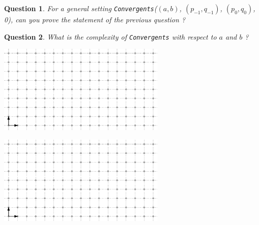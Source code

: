\documentclass[a4paper, 11pt]{article}
\newtheorem{qu}{Question}
\begin{document}
\begin{qu}
  For a general setting \emph{\texttt{Convergents}}($(a,b)$, $(p_{-1},q_{-1})$,
  $(p_0,q_0)$, 0), can you prove the statement of the previous
  question ?
\end{qu}

\begin{qu}
  What is the complexity of \emph{\texttt{Convergents}} with respect
  to $a$ and $b$ ?
\end{qu}





\newpage
\appendix

\begin{center}
  \includegraphics[width=8cm]{domain}
\end{center}


\begin{center}
  \includegraphics[width=8cm]{domain}
\end{center}
\end{document}
